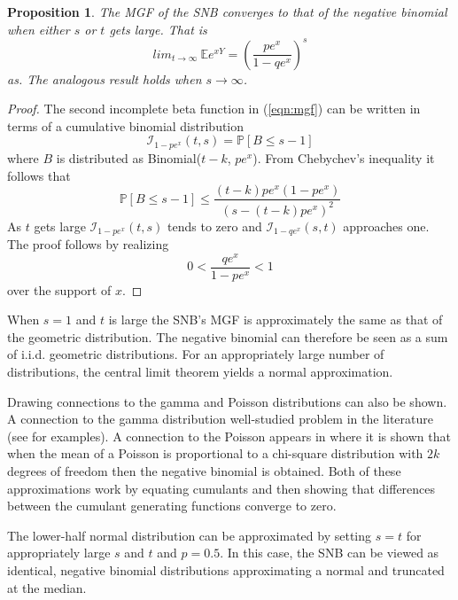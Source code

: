 \documentclass[12pt]{article}
\newtheorem{prop}{Proposition}
\begin{document}
\begin{prop}
The MGF of the SNB converges to that of the negative binomial when either
$s$ or $t$ gets large. That is
\begin{equation*}
lim_{t\to\infty} \ \mathbb{E} e^{xY} = \left( \frac{pe^x}{1-qe^x} \right)^s
\end{equation*}
as. The analogous result holds when $s \rightarrow \infty$.
\end{prop}
\begin{proof}
The second incomplete beta function in (\ref{eqn:mgf}) can be written
in terms of a cumulative binomial distribution
\begin{equation*}
\mathcal{I}_{1-pe^x}(t, s) = \mathbb{P}\left[ B \leq s-1 \right]
\end{equation*}
where $B$ is distributed as
Binomial($t-k$, $pe^x$). From Chebychev's inequality %
it follows that
\begin{equation} \label{eqn:hoeffding}
\mathbb{P}\left[ B \leq s-1 \right] \leq 
  \frac{ (t-k) pe^x (1-pe^x) }{ \left(s - (t-k)pe^x\right)^2 }
\end{equation}
As $t$ gets large $\mathcal{I}_{1-pe^x}(t, s)$ tends to zero
and $\mathcal{I}_{1-qe^x}(s, t)$ approaches 
one. The proof follows by realizing 
\begin{equation*}
0 < \frac{qe^x}{1-pe^x} < 1
\end{equation*}
over the support of $x$.
\end{proof}

When $s=1$ and $t$ is large the SNB's MGF is approximately 
the same as that of the
geometric distribution. The negative
binomial can therefore be seen as a sum of i.i.d. geometric distributions.
For an appropriately large number of distributions, the central limit theorem
yields a normal approximation.

Drawing connections to the gamma and Poisson distributions can also be shown.
A connection to the gamma distribution well-studied problem in the 
literature (see \cite{Best1974,Ord1968,Guenther1972} for examples). 
A connection to the Poisson appears in \cite{Anscombe1950} where
it is shown that when the mean of a Poisson is proportional
to a chi-square distribution with $2k$ degrees of freedom
then the negative binomial is obtained. 
Both of these approximations work by equating cumulants and then showing 
that differences between the cumulant generating
functions converge to zero.

The lower-half normal distribution can be approximated by setting $s=t$
for appropriately large $s$ and $t$ and $p = 0.5$. In this
case, the SNB can be viewed as identical, negative binomial distributions
approximating a normal and truncated at the median.
\end{document}
